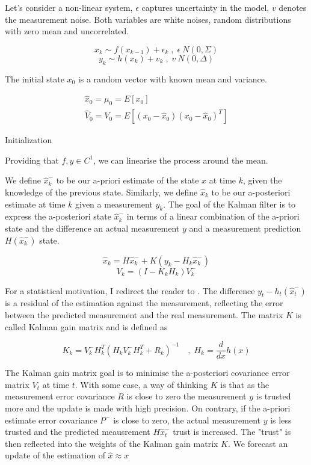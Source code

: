 \documentclass[mscthesis]{usiinfthesis}
\begin{document}
Let's consider a non-linear system, $\epsilon$ captures uncertainty in the model, $v$ denotes the measurement noise. Both variables are white noises, random distributions with zero mean and uncorrelated. 

\[
x_k \sim f(x_{k-1}) + \epsilon_k \; , \; \epsilon ~ N(0, \Sigma)
\]
\[
y_k \sim h(x_{k}) + v_{k} \; , \; v ~ N(0, \Delta)
\]

The initial state $x_0$ is a random vector with known mean and variance.

\begin{eqfloat}
\begin{equation}
\begin{array}{l}
\hat{x}_0 = \mu_0 = E[x_0] \\
\hat{V}_0 = V_0 = E[(x_0-\hat{x}_0)(x_0-\hat{x}_0)^T] 
\end{array}
\label{eq:kalman_init}
\end{equation}
\caption{Initialization}
\end{eqfloat}

Providing that $f, y \in C^1$, we can linearise the process around the mean. 

We define $\hat{x}_k^-$ to be our a-priori estimate of the state $x$ at time $k$, given the knowledge of the previous state. Similarly, we define $\hat{x}_k$ to be our a-posteriori estimate at time $k$ given a measurement $y_k$. The goal of the Kalman filter is to express the a-posteriori state $\hat{x}_k^-$ in terms of a linear combination of the a-priori state and the difference an actual measurement $y$ and a measurement prediction $H(\hat{x}_k^-)$ state. 

\[
\hat{x}_k = H\hat{x}_k^- + K (y_k - H_k \hat{x}_k^-)
\]
\[
V_k = (I-K_k H_k)V_k^-
\]


For a statistical motivation, I redirect the reader to \citet{paper:Maybeck79}. The difference $y_t - h_t(\hat{x}_t^-)$ is a residual of the estimation against the measurement, reflecting the error between the predicted measurement and the real measurement. The matrix $K$ is called Kalman gain matrix and is defined as 

\[
K_k = V_k^- H^T_k (H_k V_k^- H^T_k + R_k)^{-1}  \quad , \; H_k = \frac{d}{dx} h(x)
\]

The Kalman gain matrix goal is to minimise the a-posteriori covariance error matrix $V_t$ at time $t$. With some ease, a way of thinking $K$ is that as the measurement error covariance $R$ is close to zero the measurement $y$ is trusted more and the update is made with high precision. On contrary, if the a-priori estimate error covariance $P^-$ is close to zero, the actual measurement $y$ is less trusted and the predicted meausrement $H\hat{x}_t^-$ trust is increased. The "trust" is then reflected into the weights of the Kalman gain matrix $K$. We forecast an update of the estimation of $\hat{x} \approx x$
\end{document}
